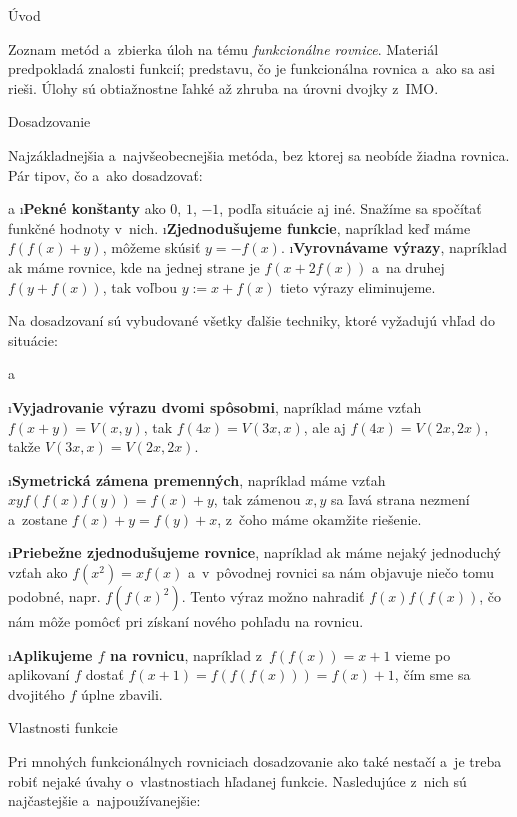 





\sec Úvod

Zoznam metód a~zbierka úloh na tému \textit{funkcionálne rovnice}. Materiál predpokladá znalosti funkcií; predstavu, čo je funkcionálna rovnica a~ako sa asi rieši. Úlohy sú obtiažnostne ľahké až zhruba na úrovni dvojky z~IMO.

\sec Dosadzovanie

Najzákladnejšia a~najvšeobecnejšia metóda, bez ktorej sa neobíde žiadna rovnica. Pár tipov, čo a~ako dosadzovať:

\begitems \style a
\i \textbf{Pekné konštanty} ako $0$, $1$, $-1$, podľa situácie aj iné. Snažíme sa spočítať funkčné hodnoty v~nich.
\i \textbf{Zjednodušujeme funkcie}, napríklad keď máme $f(f(x)+y)$, môžeme skúsiť $y=-f(x)$.
\i \textbf{Vyrovnávame výrazy}, napríklad ak máme rovnice, kde na jednej strane je $f(x+2f(x))$ a~na druhej $f(y+f(x))$, tak voľbou $y:=x+f(x)$ tieto výrazy eliminujeme.
\enditems

Na dosadzovaní sú vybudované všetky ďalšie techniky, ktoré vyžadujú vhľad do situácie:

\begitems \style a

\i \textbf{Vyjadrovanie výrazu dvomi spôsobmi}, napríklad máme vzťah $f(x+y)=V(x,y)$, tak $f(4x)=V(3x,x)$, ale aj $f(4x)=V(2x,2x)$, takže $V(3x,x)=V(2x,2x)$. 

\i \textbf{Symetrická zámena premenných}, napríklad máme vzťah $xyf(f(x)f(y))=f(x)+y$, tak zámenou $x,y$ sa ľavá strana nezmení a~zostane $f(x)+y=f(y)+x$, z~čoho máme okamžite riešenie.

\i \textbf{Priebežne zjednodušujeme rovnice}, napríklad ak máme nejaký jednoduchý vzťah ako $f(x^2)=xf(x)$ a~v~pôvodnej rovnici sa nám objavuje niečo tomu podobné, napr. $f(f(x)^2)$. Tento výraz možno nahradiť $f(x)f(f(x))$, čo nám môže pomôcť pri získaní nového pohľadu na rovnicu.

\i \textbf{Aplikujeme $f$ na rovnicu}, napríklad z~$f(f(x))=x+1$ vieme po aplikovaní $f$ dostať $f(x+1)=f(f(f(x)))=f(x)+1$, čím sme sa dvojitého $f$ úplne zbavili.

\enditems

\sec Vlastnosti funkcie

Pri mnohých funkcionálnych rovniciach dosadzovanie ako také nestačí a~je treba robiť nejaké úvahy o~vlastnostiach hľadanej funkcie. Nasledujúce z~nich sú najčastejšie a~najpoužívanejšie:

